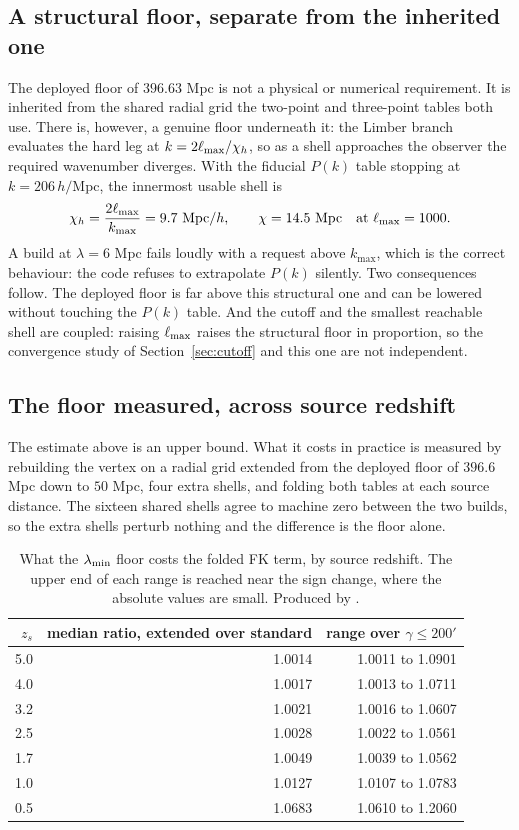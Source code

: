 \subsection{A structural floor, separate from the inherited one}

The deployed floor of $396.63$ Mpc is not a physical or numerical
requirement. It is inherited from the shared radial grid the two-point and
three-point tables both use. There is, however, a genuine floor underneath
it: the Limber branch evaluates the hard leg at $k = 2\ell_{\max}/\chi_h$, so as
a shell approaches the observer the required wavenumber diverges. With the
fiducial $P(k)$ table stopping at $k = 206\,h/$Mpc, the innermost usable
shell is
\[
  \chi_h = \frac{2\ell_{\max}}{k_{\max}} = 9.7\ \mathrm{Mpc}/h,
  \qquad \chi = 14.5\ \mathrm{Mpc} \quad \text{at } \ell_{\max} = 1000 .
\]
A build at $\lambda = 6$ Mpc fails loudly with a request above $k_{\max}$,
which is the correct behaviour: the code refuses to extrapolate $P(k)$
silently. Two consequences follow. The deployed floor is far above this
structural one and can be lowered without touching the $P(k)$ table. And
the cutoff and the smallest reachable shell are coupled: raising $\ell_{\max}$
raises the structural floor in proportion, so the convergence study of
Section~\ref{sec:cutoff} and this one are not independent.

\subsection{The floor measured, across source redshift}

The estimate above is an upper bound. What it costs in practice is measured
by rebuilding the vertex on a radial grid extended from the deployed floor
of $396.6$ Mpc down to $50$ Mpc, four extra shells, and folding both tables
at each source distance. The sixteen shared shells agree to machine zero
between the two builds, so the extra shells perturb nothing and the
difference is the floor alone.

\begin{table}[h]
\centering
\begin{tabular}{rrr}
\toprule
$z_s$ & median ratio, extended over standard & range over $\gamma\le200'$ \\
\midrule
5.0 & 1.0014 & 1.0011 to 1.0901 \\
4.0 & 1.0017 & 1.0013 to 1.0711 \\
3.2 & 1.0021 & 1.0016 to 1.0607 \\
2.5 & 1.0028 & 1.0022 to 1.0561 \\
1.7 & 1.0049 & 1.0039 to 1.0562 \\
1.0 & 1.0127 & 1.0107 to 1.0783 \\
0.5 & 1.0683 & 1.0610 to 1.2060 \\
\bottomrule
\end{tabular}
\caption{What the $\lambda_{\min}$ floor costs the folded FK term, by source
redshift. The upper end of each range is reached near the sign change,
where the absolute values are small. Produced by
.}
\label{tab:floor}
\end{table}

